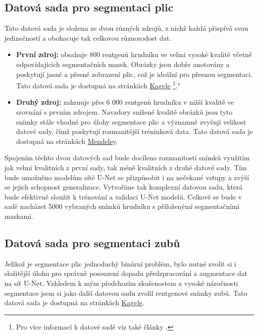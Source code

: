 \documentclass[male,czech,api_ing]{thesis}
\begin{document}
\subsection{Datová sada pro segmentaci plic}
Tato datová sada je složena ze dvou různých zdrojů, z nichž každá přispívá svou jedinečností a obohacuje tak celkovou různorodost dat.

\begin{itemize}
    \item \textbf{První zdroj:} obsahuje 800 rentgenů hrudníku ve velmi vysoké kvalitě včetně odpovídajících segmentačních masek. Obrázky jsou dobře anotovány a poskytují jasné a přesné zobrazení plic, což je ideální pro přesnou segmentaci. Tato datová sada je dostupná na stránkách \href{https://www.kaggle.com/datasets/nikhilpandey360/chest-xray-masks-and-labels}{Kaggle} \footnote{Pro více informací k datové sadě viz také články \cite{LungDatasetNeeded, LungDatasetNeeded2}.}."
    \item \textbf{Druhý zdroj:} zahrnuje přes 6 000 rentgenů hrudníku v nižší kvalitě ve srovnání s prvním zdrojem. Navzdory snížené kvalitě obrázků jsou tyto snímky stále vhodné pro úlohy segmentace plic a významně zvyšují velikost datové sady, čímž poskytují rozmanitější tréninková data. Tato datová sada je dostupná na stránkách \href{https://data.mendeley.com/datasets/8gf9vpkhgy/1}{Mendeley}. \cite{LungDataset2}
\end{itemize}

Spojením těchto dvou datových sad bude docíleno rozmanitosti snímků využitím jak velmi kvalitních z první sady, tak méně kvalitních z druhé datové sady. Tím bude umožněno modelům sítě U-Net se přizpůsobit i na nečekané vstupy a zvýší se jejich schopnost generalizace. Vytvoříme tak komplexní datovou sadu, která bude efektivně sloužit k trénování a validaci U-Net modelů. Celkově se bude v sadě nacházet 5000 vybraných snímků hrudníku s přiloženými segmentačními maskami.

\subsection{Datová sada pro segmentaci zubů}
Jelikož je segmentace plic jednoduchý binární problém, bylo nutné zvolit si i složitější úlohu pro správně posouzení dopadu předzpracování a augmentace dat na síť U-Net. Vzhledem k mým předchozím zkušenostem a vysoké náročnosti segmentace jsem si jako další datovou sadu zvolil rentgenové snímky zubů. Tato datová sada je dostupná na stránkách \href{https://www.kaggle.com/datasets/humansintheloop/teeth-segmentation-on-dental-x-ray-images}{Kaggle}. \cite{TeethDataset}
\end{document}
